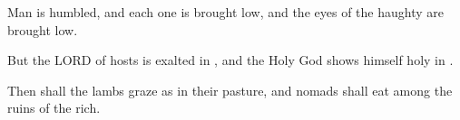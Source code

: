 \documentclass[11pt]{article}
\begin{document}
\vspace{1em}

\begin{biblicaloutline}[Isaiah 5:15-17 (C)]

    \begin{versesection}{2em}
         Man is humbled, and each one is brought low,
        \poetryline and the eyes of the haughty are brought low.
        
         But the LORD of hosts is exalted in ,
        \poetryline and the Holy God shows himself holy in .
        
         Then shall the lambs graze as in their pasture,
        \poetryline and nomads shall eat among the ruins of the rich.
    \end{versesection}

\end{biblicaloutline}
\end{document}
